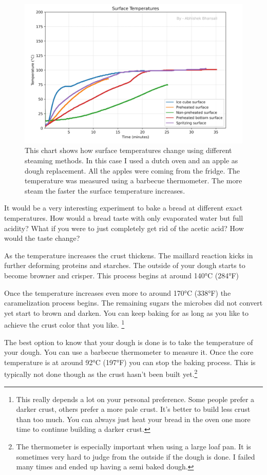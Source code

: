 \begin{figure}[!htb]
  \includegraphics[width=\textwidth]{baking-experiment-temperatures.png}
  \caption{This chart shows how surface temperatures change using
  different steaming methods. In this case I used a dutch oven and an apple as
  dough replacement. All the apples were coming from the fridge. The temperature
  was measured using a barbecue thermometer.
  The more steam the faster the surface temperature increases.}
\end{figure}

It would be a very interesting experiment to bake a bread at different exact
temperatures. How would a bread taste with only evaporated water but
full acidity? What if you were to just completely get rid of the acetic
acid? How would the taste change?

As the temperature increases
the crust thickens. The maillard reaction kicks in further deforming
proteins and starches. The outside of your dough starts to become
browner and crisper. This process begins at around 140°C (284°F)

Once the temperature increases even more to around 170°C (338°F)
the caramelization process begins. The remaining sugars the microbes
did not convert yet start to brown and darken. You can keep baking
for as long as you like to achieve the crust color that you like.
\footnote{This really depends a lot on your personal preference.
Some people prefer a darker crust, others prefer a more pale crust.
It's better to build less crust than too much. You can always just
heat your bread in the oven one more time to continue building a
darker crust.}

The best option to know that your dough is done is to take
the temperature of your dough. You can use a barbecue thermometer
to measure it. Once the core temperature is at around 92°C (197°F)
you can stop the baking process. This is typically not done though
as the crust hasn't been built yet.\footnote{The thermometer is
especially important when using a large loaf pan. It is sometimes
very hard to judge from the outside if the dough is done. I failed
many times and ended up having a semi baked dough.}

